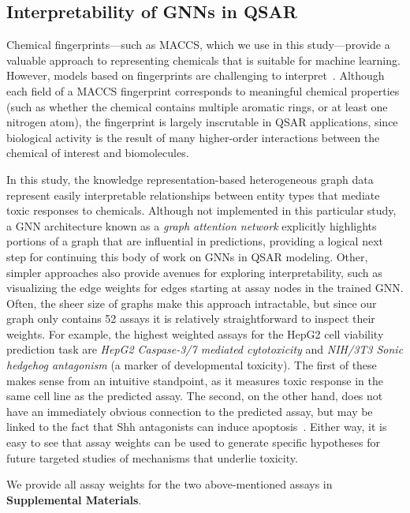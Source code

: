 \documentclass{ws-procs11x85}
\begin{document}
\subsection{Interpretability of GNNs in QSAR}
Chemical fingerprints---such as MACCS, which we use in this study---provide a valuable approach to representing chemicals that is suitable for machine learning.
However, models based on fingerprints are challenging to interpret~\cite{cherkasov2014qsar,matveieva2021benchmarks}.
Although each field of a MACCS fingerprint corresponds to meaningful chemical properties (such as whether the chemical contains multiple aromatic rings, or at least one nitrogen atom), the fingerprint is largely inscrutable in QSAR applications, since biological activity is the result of many higher-order interactions between the chemical of interest and biomolecules.

In this study, the knowledge representation-based heterogeneous graph data represent easily interpretable relationships between entity types that mediate toxic responses to chemicals.
Although not implemented in this particular study, a GNN architecture known as a \textit{graph attention network} explicitly highlights portions of a graph that are influential in predictions, providing a logical next step for continuing this body of work on GNNs in QSAR modeling.
Other, simpler approaches also provide avenues for exploring interpretability, such as visualizing the edge weights for edges starting at assay nodes in the trained GNN.
Often, the sheer size of graphs make this approach intractable, but since our graph only contains 52 assays it is relatively straightforward to inspect their weights.
For example, the highest weighted assays for the HepG2 cell viability prediction task are \textit{HepG2 Caspase-3/7 mediated cytotoxicity} and \textit{NIH/3T3 Sonic hedgehog antagonism} (a marker of developmental toxicity).
The first of these makes sense from an intuitive standpoint, as it measures toxic response in the same cell line as the predicted assay.
The second, on the other hand, does not have an immediately obvious connection to the predicted assay, but may be linked to the fact that Shh antagonists can induce apoptosis~\cite{wu2017smoothened}.
Either way, it is easy to see that assay weights can be used to generate specific hypotheses for future targeted studies of mechanisms that underlie toxicity.

We provide all assay weights for the two above-mentioned assays in \textbf{Supplemental Materials}.
\end{document}
